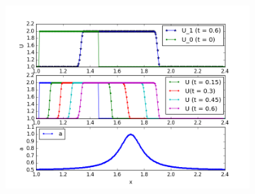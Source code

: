 \documentclass{article}
\begin{document}
\begin{figure}[h]
\begin{subfigure}{0.33\textwidth}
    \includegraphics[width=1\linewidth]{TVD_tests/lim_MC_a_hat_U0_step.png}
    \end{subfigure}
\end{figure}
\end{document}
